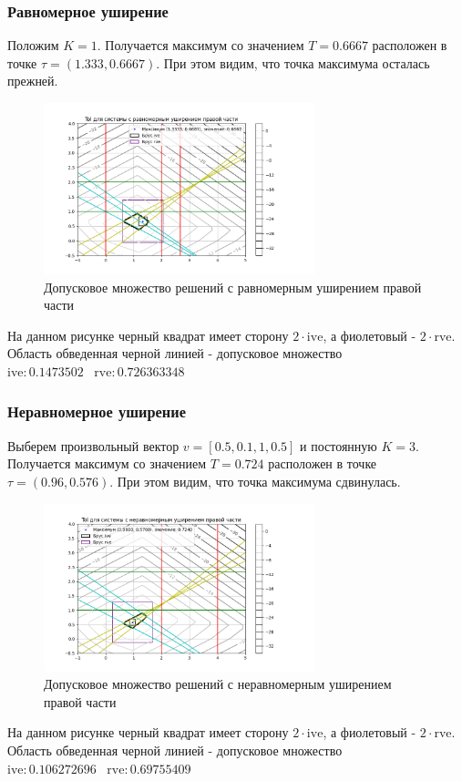 \documentclass[a4paper,12pt]{article}
\begin{document}
\subsubsection{Равномерное уширение}
Положим $K=1$. Получается максимум со значением $T=0.6667$ расположен в точке $\tau=(1.333,0.6667)$. При этом видим, что точка максимума осталась прежней.
\begin{figure}[H] \label{MatrixCorrSet}
    \centering
    \includegraphics[width=0.7\textwidth]{even_right.png}
    \caption{Допусковое множество решений с равномерным уширением правой части} 
\end{figure}
\noindent На данном рисунке черный квадрат имеет сторону $2\cdot \mathrm{ive}$, а фиолетовый - $2\cdot \mathrm{rve}$. Область обведенная черной линией - допусковое множество\\
$\mathrm{ive}: 0.1473502 \;\;\;\mathrm{rve}: 0.726363348$

\subsubsection{Неравномерное уширение}
Выберем произвольный вектор $v = [0.5, 0.1, 1, 0.5]$ и постоянную $K = 3$. \\
Получается максимум со значением $T=0.724$ расположен в точке $\tau=(0.96, 0.576)$. При этом видим, что точка максимума сдвинулась.
\begin{figure}[H] \label{MatrixCorrSet}
    \centering
    \includegraphics[width=0.7\textwidth]{uneven_right.png}
    \caption{Допусковое множество решений с неравномерным уширением правой части} 
\end{figure}
\noindent На данном рисунке черный квадрат имеет сторону $2\cdot \mathrm{ive}$, а фиолетовый - $2\cdot \mathrm{rve}$. Область обведенная черной линией - допусковое множество\\
$\mathrm{ive}: 0.106272696 \;\;\;\mathrm{rve}: 0.69755409$
\end{document}
